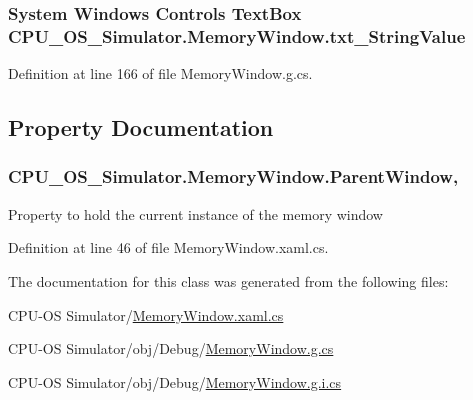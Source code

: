 \subsubsection[{txt\+\_\+\+String\+Value}]{\setlength{\rightskip}{0pt plus 5cm}System Windows Controls Text\+Box C\+P\+U\+\_\+\+O\+S\+\_\+\+Simulator.\+Memory\+Window.\+txt\+\_\+\+String\+Value\hspace{0.3cm}{\ttfamily [package]}}\label{class_c_p_u___o_s___simulator_1_1_memory_window_aca8e57432af036b698d0eeaaa765c483}


Definition at line 166 of file Memory\+Window.\+g.\+cs.



\subsection{Property Documentation}
\hypertarget{class_c_p_u___o_s___simulator_1_1_memory_window_ad61b6543a424be98fd0a4e0fa732f3d4}{}
\subsubsection[{Parent\+Window}]{ C\+P\+U\+\_\+\+O\+S\+\_\+\+Simulator.\+Memory\+Window.\+Parent\+Window\hspace{0.3cm}{\ttfamily [get]}, {\ttfamily [set]}}\label{class_c_p_u___o_s___simulator_1_1_memory_window_ad61b6543a424be98fd0a4e0fa732f3d4}


Property to hold the current instance of the memory window 



Definition at line 46 of file Memory\+Window.\+xaml.\+cs.



The documentation for this class was generated from the following files\+:\begin{DoxyCompactItemize}
\item 
C\+P\+U-\/\+O\+S Simulator/\hyperlink{_memory_window_8xaml_8cs}{Memory\+Window.\+xaml.\+cs}\item 
C\+P\+U-\/\+O\+S Simulator/obj/\+Debug/\hyperlink{_debug_2_memory_window_8g_8cs}{Memory\+Window.\+g.\+cs}\item 
C\+P\+U-\/\+O\+S Simulator/obj/\+Debug/\hyperlink{_debug_2_memory_window_8g_8i_8cs}{Memory\+Window.\+g.\+i.\+cs}\end{DoxyCompactItemize}

